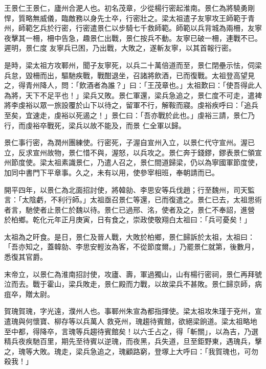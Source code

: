 \begin{pinyinscope}
 王景仁王景仁，廬州合淝人也。初名茂章，少從楊行密起淮南。景仁為將驍勇剛悍，質略無威儀，臨敵務以身先士卒，行密壯之。梁太祖遣子友寧攻王師範于青州，師範乞兵於行密，行密遣景仁以步騎七千救師範。師範以兵背城為兩柵，友寧夜擊其一柵，柵中告急，趣景仁出戰，景仁按兵不動。友寧已破一柵，連戰不已。遲明，景仁度
 友寧兵已困，乃出戰，大敗之，遂斬友寧，以其首報行密。



 是時，梁太祖方攻鄆州，聞子友寧死，以兵二十萬倍道而至，景仁閉壘示怯，伺梁兵怠，毀柵而出，驅馳疾戰，戰酣退坐，召諸將飲酒，已而復戰。太祖登高望見之，得青州降人，問：「飲酒者為誰？」曰：「王茂章也。」太祖歎曰：「使吾得此人為將，天下不足平也！」梁兵又敗。景仁軍還，梁兵急追之，景仁度不可走，遣裨將李虔裕以眾一旅設覆於山下以待之，留軍不行，解鞍而寢。虔裕疾呼曰：「追兵至矣，宜速走，虔裕以死遏之！」景仁曰：「吾亦戰於此也。」虔裕三請，景仁乃行，而虔裕卒戰死，梁兵以故不能及，而景
 仁全軍以歸。



 景仁事行密，為潤州團練使。行密死，子渥自宣州入立，以景仁代守宣州。渥已立，反求宣州故物，景仁惜不與，渥怒，以兵攻之。景仁奔于錢鏐，鏐表景仁領宣州節度使。梁太祖素識景仁，乃遣人召之，景仁間道歸梁，仍以為寧國軍節度使，加同中書門下平章事。久之，未有以用，使參宰相班，奉朝請而已。



 開平四年，以景仁為北面招討使，將韓勍、李思安等兵伐趙；行至魏州，司天監言：「太陰虧，不利行師。」太祖亟召景仁等還，已而復遣之。景仁已去，太祖思術者言，馳使者止景仁於魏以待。景仁已過邢、洺，使者及之，景仁不奉詔，進營
 於柏鄉。乾化元年正月庚寅，日有食之，崇政使敬翔白太祖曰：「兵可憂矣！」



 太祖為之旰食。是日，景仁及晉人戰，大敗於柏鄉，景仁歸訴於太祖，太祖曰：「吾亦知之，蓋韓勍、李思安輕汝為客，不從節度爾。」乃罷景仁就第，後數月，悉復其官爵。



 末帝立，以景仁為淮南招討使，攻廬、壽，軍過獨山，山有楊行密祠，景仁再拜號泣而去。戰于霍山，梁兵敗走，景仁殿而力戰，以故梁兵不甚敗。景仁歸京師，病疽卒，贈太尉。



 賀瑰賀瑰，字光遠，濮州人也。事鄆州朱宣為都指揮使。梁太祖攻朱瑾于兗州，宣遣瑰與何懷寶、柳存等以兵萬人
 救兗州，瑰趨待賓館，欲絕梁餉道。梁太祖略地至中都，得降卒，言瑰等兵趨待賓館矣！以六壬占之，得「斬關」，以為吉，乃選精兵夜疾馳百里，期先至待賓以逆瑰，而夜黑，兵失道，旦至鉅野東，遇瑰兵，擊之，瑰等大敗。瑰走，梁兵急追之，瑰顧路窮，登塚上大呼曰：「我賀瑰也，可勿殺我！」




\end{pinyinscope}
